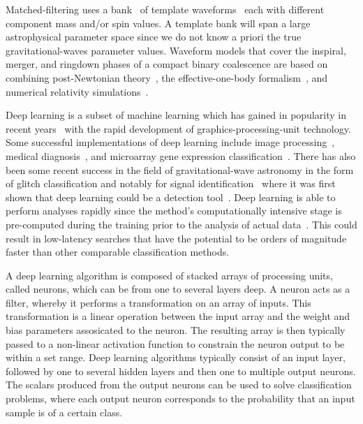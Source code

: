 \documentclass[%
showpacs,
 amsmath,amssymb,
 aps,
 twocolumn,
 prl,
 reprint,
floatfix,
]{revtex4-1}
\begin{document}
%
%
Matched-filtering uses a bank~\cite{PhysRevD.86.084017,
1705.01845,PhysRevD.80.104014, PhysRevD.90.082004, PhysRevD.89.084041} of
template waveforms~\cite{PhysRevD.44.3819, PhysRevD.89.061502,
PhysRevD.89.024003, Blanchet2014} each with different component mass
and/or spin values. A template bank will span a large astrophysical parameter
space since we do not know a priori the true gravitational-waves parameter
values. Waveform models that cover the inspiral, merger, and ringdown phases of
a compact binary coalescence are based on combining post-Newtonian
theory~\cite{PhysRevD.84.049901,PhysRevD.80.084043,Blanchet2014,PhysRevD.93.084054},
the effective-one-body formalism~\cite{PhysRevD.59.084006}, and numerical
relativity simulations~\cite{PhysRevLett.95.121101}.

%
%
Deep learning is a subset of machine learning which has gained in popularity in
recent years~\cite{NIPS2012_4824, 1406.2661, 1409.1556, 1412.7062, 1311.2901,
1409.4842} with the rapid development of graphics-processing-unit technology.
Some successful implementations of deep learning include image processing~\cite{1603.08511,1412.2306,NIPS2012_4824}, medical
diagnosis~\cite{KONONENKO200189}, and microarray gene expression
classification~\cite{Pirooznia2008}. There has also been
some recent success in the field of gravitational-wave astronomy in the form of
glitch classification \cite{PhysRevD.95.104059,
0264-9381-34-6-064003,1706.07446} and notably for signal
identification~\cite{GEORGE201864,GebKilParHarSch} where it was first shown that deep learning
could be a detection tool~\cite{GEORGE201864}. Deep learning is able to %
perform analyses rapidly since the method's computationally intensive
stage is pre-computed during the training prior to the analysis of actual 
data~\cite{Goodfellow-et-al-2016}.
This could result in low-latency searches that have the potential to be orders of magnitude
faster than other comparable classification methods. %

%
%
A deep learning algorithm is composed of stacked arrays of processing units,
called neurons, which can be from one to several layers deep. A neuron
acts as a filter, whereby it performs a transformation on an array of inputs.
This transformation is a linear operation between the input array and the
weight and bias parameters assosicated to the neuron. The resulting array is
then typically passed to a non-linear activation function to constrain the
neuron output to be within a set range. Deep learning algorithms typically
consist of an input layer, followed by one to several hidden layers and then
one to multiple output neurons. The scalars produced from the output neurons
can be used to solve classification problems, where each output neuron
corresponds to the probability that an input sample is of a certain
class.
\end{document}
